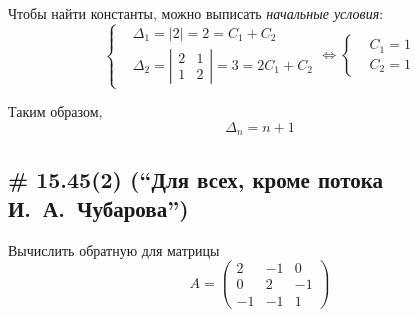\documentclass[a4paper,12pt]{article}
\theoremstyle{remark}
\begin{document}
\begin{solution}
    Чтобы найти константы, можно выписать \emph{начальные условия}:
    \[
      \left\{
        \begin{aligned}
          &\Delta_1 = |2| = 2 = C_1 + C_2\\
          &\Delta_2 = \left|\begin{smallmatrix}2 & 1 \\ 1 & 2\end{smallmatrix}\right| = 3 = 2 C_1 + C_2
        \end{aligned}
      \right. \Leftrightarrow \left\{
        \begin{aligned}
          &C_1 = 1\\
          &C_2 = 1
        \end{aligned}
      \right.
    \]
    
    Таким образом,
    \[
      \Delta_n = n + 1
    \]
  \end{solution}
  
  
  \subsection{\# 15.45(2) (``Для всех, кроме потока И.~А.~Чубарова'')}
  
  Вычислить обратную для матрицы
  \[
    A = \begin{pmatrix}
      2 & -1 & 0\\
      0 & 2 & -1\\
      -1 & -1 & 1
    \end{pmatrix}
  \]
  
\end{document}
